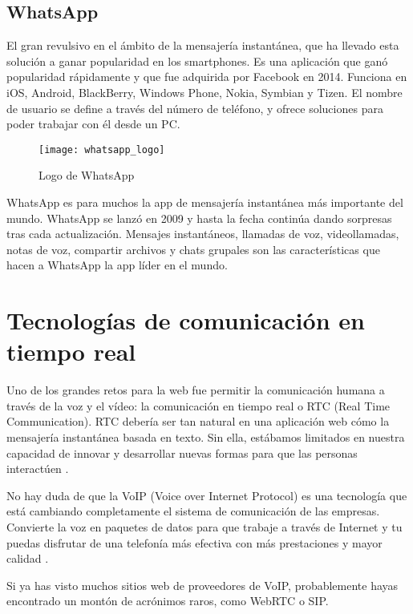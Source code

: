 \subsection{WhatsApp}

El gran revulsivo en el ámbito de la mensajería instantánea, que ha llevado esta solución a ganar popularidad en los smartphones. Es una aplicación que ganó popularidad rápidamente y que fue adquirida por Facebook en 2014. Funciona en iOS, Android, BlackBerry, Windows Phone, Nokia, Symbian y Tizen. El nombre de usuario se define a través del número de teléfono, y ofrece soluciones para poder trabajar con él desde un PC.

\begin{figure}[htp!]
  \centering
  \texttt{[image: whatsapp\_logo]}
  \caption{Logo de WhatsApp}
  \label{fig:whatsapp_logo}
\end{figure}

WhatsApp es para muchos la app de mensajería instantánea más importante del mundo. WhatsApp se lanzó en 2009 y hasta la fecha continúa dando sorpresas tras cada actualización. Mensajes instantáneos, llamadas de voz, videollamadas, notas de voz, compartir archivos y chats grupales son las características que hacen a WhatsApp la app líder en el mundo.

\section{Tecnologías de comunicación en tiempo real}

Uno de los grandes retos para la web fue permitir la comunicación humana a través de la voz y el vídeo: la comunicación en tiempo real o RTC (Real Time Communication). RTC debería ser tan natural en una aplicación web cómo la mensajería instantánea basada en texto. Sin ella, estábamos limitados en nuestra capacidad de innovar y desarrollar nuevas formas para que las personas interactúen \cite{webrtc3}.

No hay duda de que la VoIP (Voice over Internet Protocol) es una tecnología que está cambiando completamente el sistema de comunicación de las empresas. Convierte la voz en paquetes de datos para que trabaje a través de Internet y tu puedas disfrutar de una telefonía más efectiva con más prestaciones y mayor calidad \cite{webrtc2}.

Si ya has visto muchos sitios web de proveedores de VoIP, probablemente hayas encontrado un montón de acrónimos raros, como WebRTC o SIP.

